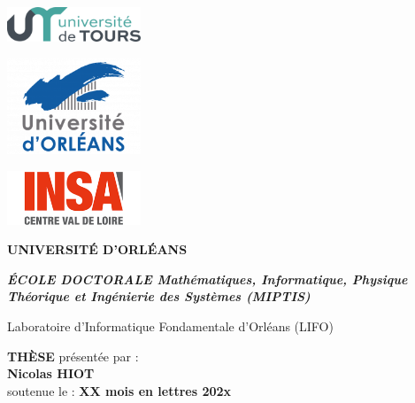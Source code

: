 \thispagestyle{empty}

{\setlength{\parindent}{0cm}

\begin{sffamily}

\begin{minipage}{1cm}
\includegraphics[width=4cm]{logos/logoTours.png} 
\end{minipage}
\hfill
\begin{minipage}{1cm}
\includegraphics[width=4cm]{logos/logoOrleans2022.png} 
\end{minipage}
\hfill
\begin{minipage}{3cm}
\includegraphics[width=4cm]{logos/logoINSA.png} 
\end{minipage}

\vspace{0.5cm}
\begin{minipage}{15.5cm}
\centering
\LARGE\textbf{UNIVERSITÉ D'ORLÉANS}
\end{minipage}
\hfill

\vspace{0.3cm}

\begin{minipage}{\textwidth}
\centering
\LARGE\textit{\textbf{ÉCOLE DOCTORALE Mathématiques, Informatique, Physique Théorique et Ingénierie des Systèmes (MIPTIS)}}

Laboratoire d'Informatique Fondamentale d'Orléans (LIFO)
\end{minipage}

\vspace{0.3cm}

\begin{minipage}{\textwidth}
\centering\LARGE
\textbf{THÈSE} \normalsize présentée par : \\
\vspace{0.3cm}
\LARGE\textbf{Nicolas HIOT}\\
\vspace{0.3cm}
soutenue le : \textbf{XX mois en lettres 202x}
\end{minipage}
	

\end{sffamily}}
